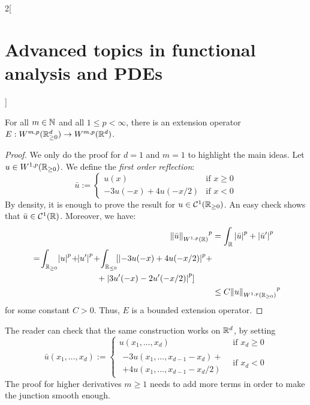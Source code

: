 \documentclass[../../../main_math.tex]{subfiles}
\begin{document}
\begin{multicols}{2}[\section{Advanced topics in functional analysis and PDEs}]
\begin{remark}
  \end{remark}
  \begin{theorem}
    For all $m\in\mathbb{N}$ and all $1\leq p<\infty$, there is an extension operator $E:W^{m,p}(\mathbb{R}_{\geq 0}^d)\to W^{m,p}(\mathbb{R}^d)$.
  \end{theorem}
  \begin{proof}
    We only do the proof for $d=1$ and $m=1$ to highlight the main ideas. Let $u\in W^{1,p}(\mathbb{R}_{\geq 0})$. We define the \emph{first order reflection}:
    $$
      \bar{u}:=\begin{cases}
        u(x)             & \text{if }x\geq 0 \\
        -3u(-x)+4u(-x/2) & \text{if }x<0
      \end{cases}
    $$
    By density, it is enough to prove the result for $u\in \mathcal{C}^1(\mathbb{R}_{\geq 0})$. An easy check shows that $\bar{u}\in \mathcal{C}^1(\mathbb{R})$. Moreover, we have:
    \begin{align*}
      {\norm{\bar{u}}_{W^{1,p}(\RR)}}^p & =\int_{\RR}{\abs{\bar{u}}^p}+{\abs{\bar{u}'}^p}                                                 \\
      \begin{split}
        &=\!\int_{\RR_{\geq 0}}\!{\abs{u}^p}\!+\!\!{\abs{u'}^p}\!+\!\int_{\RR_{\leq 0}}\![{\abs{-3u(-x)+4u(-x/2)}^p}+\\
        &\hspace{2.75cm}+{\abs{3u'(-x)-2u'(-x/2)}^p}]
      \end{split} \\
                                        & \leq C{\norm{u}_{W^{1,p}(\RR_{\geq 0})}}^p
    \end{align*}
    for some constant $C>0$. Thus, $E$ is a bounded extension operator.
  \end{proof}
  \begin{remark}
    The reader can check that the same construction works on $\mathbb{R}^d$, by setting
    $$
      \bar{u}(x_1,\ldots,x_d):=
      \begin{cases}
        u(x_1,\ldots,x_d)              & \text{if }x_d\geq 0 \\
        \begin{split}
          -3u(x_1,\ldots,x_{d-1}-x_d)+\\
          +4u(x_1,\ldots,x_{d-1}-x_d/2)
        \end{split} & \text{if }x_d<0
      \end{cases}
    $$
    The proof for higher derivatives $m \geq 1$ needs to add more terms in order to make the junction smooth enough.

\end{remark}
\end{multicols}
\end{document}

